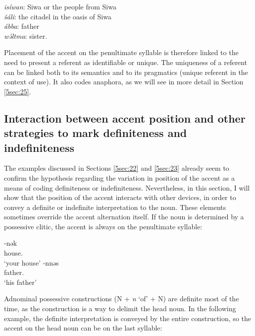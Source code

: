 \documentclass[output=paper]{langsci/langscibook}
\begin{document}
\begin{exe}
\exi{}
{\emph{isíwan}}: Siwa or the people from Siwa \\
{\emph{šáli}}: the citadel in the oasis of Siwa \\
{\emph{ábba}}: father \\
{\emph{wə́ltma}}: sister. 
\end{exe}

{
Placement of the accent on the penultimate syllable is therefore linked to the need to present a referent as identifiable or unique. The uniqueness of a referent can be linked both to its semantics and to its pragmatics (unique referent in the context of use). It also codes anaphora, as we will see in more detail in Section \ref{5sec:25}.
}

\subsection{Interaction between accent position and other strategies to mark definiteness and indefiniteness}\label{5sec:24}

The examples discussed in Sections \ref{5sec:22} and \ref{5sec:23} already seem to confirm the hypothesis regarding the variation in position of the accent as a means of coding definiteness or indefiniteness. Nevertheless, in this section, I will show that the position of the accent interacts with other devices, in order to convey a definite or indefinite interpretation to the noun. These elements sometimes override the accent alternation itself. If the noun is determined by a possessive clitic, the accent is always on the penultimate syllable:

\begin{exe}
\ex\label{5ex:22}
-nək \\
	house.{} \\
\glt	`your house'
\ex\label{5ex:23}
-nnəs \\
	father.{} \\
\glt	`his father'
\end{exe}

Adnominal possessive constructions (N + {\emph{n}} `of' + N) are definite most of the time, as the construction is a way to delimit the head noun. In the following example, the definite interpretation is conveyed by the entire construction, so the accent on the head noun can be on the last syllable:
\end{document}
